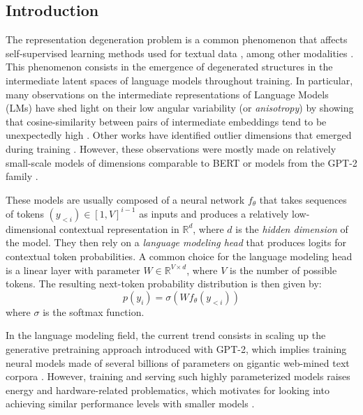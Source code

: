 
\subsection{Introduction}
The representation degeneration problem is a common phenomenon that affects self-supervised learning methods used for textual data \citep{gao2018representation,lai-etal-2023-mitigating}, among other modalities \citep{jing2022understanding,godey2024anisotropy}.
% 
This phenomenon consists in the emergence of degenerated structures in the intermediate latent spaces of language models throughout training.
In particular, many observations on the intermediate representations of Language Models (LMs) have shed light on their low angular variability (or \textit{anisotropy}) by showing that cosine-similarity between pairs of intermediate embeddings tend to be unexpectedly high \citep{freq-based-dist, rajaee-pilehvar-2022-isotropy}. Other works have identified outlier dimensions that emerged during training \citep{puccetti-etal-2022-outlier}. However, these observations were mostly made on relatively small-scale models of dimensions comparable to BERT \citep{devlin-etal-2019-bert} or models from the GPT-2 family \citep{radford2019language}.

These models are usually composed of a neural network $f_\theta$ that takes sequences of tokens $(y_{<i}) \in [1,V]^{i-1}$ as inputs and produces a relatively low-dimensional contextual representation in $\mathbb{R}^d$, where $d$ is the \textit{hidden dimension} of the model. They then rely on a \textit{language modeling head} that produces logits for contextual token probabilities. A common choice for the language modeling head is a linear layer with parameter $W \in \mathbb{R}^{V \times d}$, where $V$ is the number of possible tokens. The resulting next-token probability distribution is then given by:
$$
p(y_i) = \sigma (W f_\theta(y_{<i}))
$$
where $\sigma$ is the softmax function.

In the language modeling field, the current trend consists in scaling up the generative pretraining approach introduced with GPT-2, which implies training neural models made of several billions of parameters on gigantic web-mined text corpora \citep{brown2020language, touvron2023llama, almazrouei2023falcon, jiang2023mistral}. However, training and serving such highly parameterized models raises energy and hardware-related problematics, which motivates for looking into achieving similar performance levels with smaller models \citep{beyond_chinchilla}.

